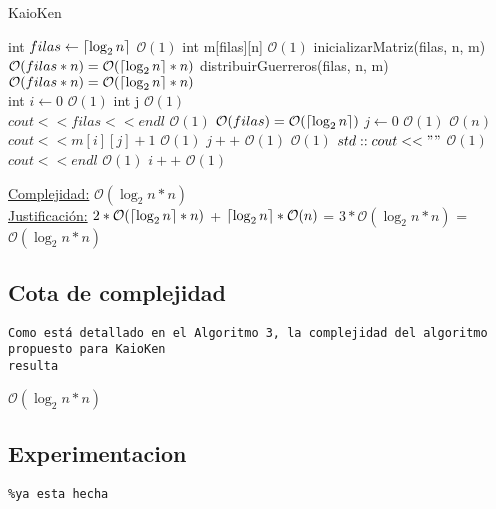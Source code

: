 \documentclass[10pt,a4paper]{article}
\DeclarePairedDelimiter\ceil{\lceil}{\rceil}
\begin{document}
\begin{algorithm}
\caption{KaioKen}
\begin{algorithmic}
	\State int $filas \gets \ceil*{\log_2 n}$ \Comment $\mathcal{O}(1)$
	\State int m[filas][n] \Comment $\mathcal{O}(1)$
	\State inicializarMatriz(filas, n, m) \Comment $\mathcal{O}(filas*n) = \mathcal{O}(\ceil*{\log_2 n}*n)$
	\State distribuirGuerreros(filas, n, m) \Comment $\mathcal{O}(filas*n) = \mathcal{O}(\ceil*{\log_2 n}*n)$
	\\
	\State int $i \gets 0$ \Comment $\mathcal{O}(1)$
	\State int j \Comment $\mathcal{O}(1)$
	\\
	\State $cout << filas << endl$ \Comment $\mathcal{O}(1)$
	 \Comment $\mathcal{O}(filas) = \mathcal{O}(\ceil*{\log_2 n})$
		\State $j \gets 0$ \Comment $\mathcal{O}(1)$
		 \Comment $\mathcal{O}(n)$
			\State $cout << m[i][j]+1$ \Comment $\mathcal{O}(1)$
			\State $j++$ \Comment $\mathcal{O}(1)$
			 \Comment $\mathcal{O}(1)$
				\State $std::cout << " "$ \Comment $\mathcal{O}(1)$
			\EndIf
		\EndWhile
		\State $cout << endl$ \Comment $\mathcal{O}(1)$
		\State $i++$ \Comment $\mathcal{O}(1)$
	\EndWhile
\EndFunction
\end{algorithmic}
\underline{Complejidad:} $\mathcal{O}(\log _{2} n * n)$\\
    \underline{Justificación:} $ 2 * \mathcal{O}(\ceil*{\log_2 n}*n)$ + $ \ceil*{\log_2 n} * \mathcal{O}(n)$ = $3*\mathcal{O}(\log _{2} n * n)$ = $\mathcal{O}(\log _{2} n * n)$\\
\end{algorithm}


\newpage
\subsection{Cota de complejidad}
\begin{verbatim}
Como está detallado en el Algoritmo 3, la complejidad del algoritmo propuesto para KaioKen
resulta
\end{verbatim}
$\mathcal{O}(\log _{2} n * n)$\\

\subsection{Experimentacion}
\begin{verbatim}
%ya esta hecha
\end{verbatim}


\end{document}
